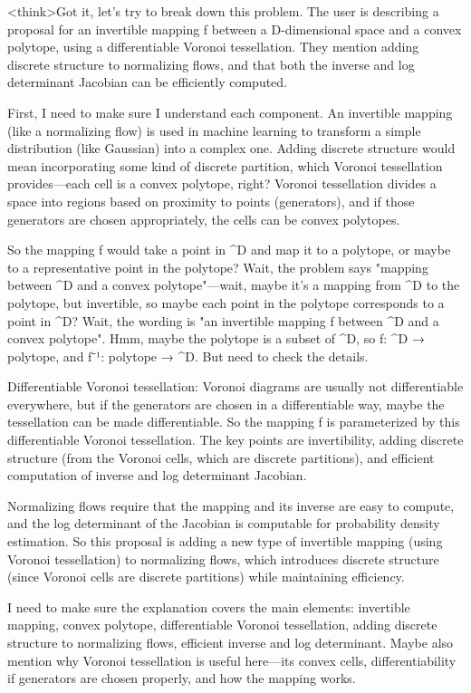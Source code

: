<think>Got it, let's try to break down this problem. The user is describing a proposal for an invertible mapping f between a D-dimensional space and a convex polytope, using a differentiable Voronoi tessellation. They mention adding discrete structure to normalizing flows, and that both the inverse and log determinant Jacobian can be efficiently computed. 

First, I need to make sure I understand each component. An invertible mapping (like a normalizing flow) is used in machine learning to transform a simple distribution (like Gaussian) into a complex one. Adding discrete structure would mean incorporating some kind of discrete partition, which Voronoi tessellation provides—each cell is a convex polytope, right? Voronoi tessellation divides a space into regions based on proximity to points (generators), and if those generators are chosen appropriately, the cells can be convex polytopes. 

So the mapping f would take a point in ^D and map it to a polytope, or maybe to a representative point in the polytope? Wait, the problem says "mapping between ^D and a convex polytope"—wait, maybe it's a mapping from ^D to the polytope, but invertible, so maybe each point in the polytope corresponds to a point in ^D? Wait, the wording is "an invertible mapping f between ^D and a convex polytope". Hmm, maybe the polytope is a subset of ^D, so f: ^D → polytope, and f⁻¹: polytope → ^D. But need to check the details. 

Differentiable Voronoi tessellation: Voronoi diagrams are usually not differentiable everywhere, but if the generators are chosen in a differentiable way, maybe the tessellation can be made differentiable. So the mapping f is parameterized by this differentiable Voronoi tessellation. The key points are invertibility, adding discrete structure (from the Voronoi cells, which are discrete partitions), and efficient computation of inverse and log determinant Jacobian. 

Normalizing flows require that the mapping and its inverse are easy to compute, and the log determinant of the Jacobian is computable for probability density estimation. So this proposal is adding a new type of invertible mapping (using Voronoi tessellation) to normalizing flows, which introduces discrete structure (since Voronoi cells are discrete partitions) while maintaining efficiency. 

I need to make sure the explanation covers the main elements: invertible mapping, convex polytope, differentiable Voronoi tessellation, adding discrete structure to normalizing flows, efficient inverse and log determinant. Maybe also mention why Voronoi tessellation is useful here—its convex cells, differentiability if generators are chosen properly, and how the mapping works. 

